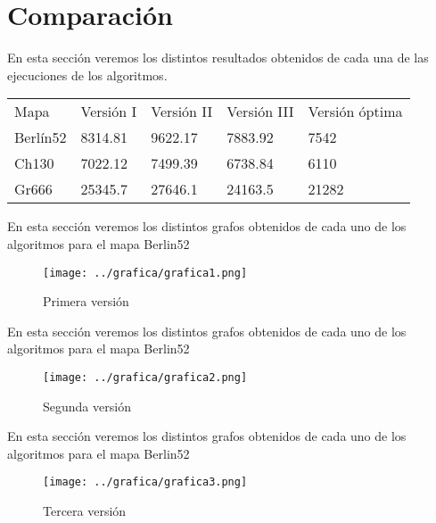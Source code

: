 	\section{Comparación}

		En esta sección veremos los distintos resultados obtenidos de cada una de las ejecuciones de los algoritmos.
		
		\begin{table}[H]
			\centering
			
			
			\begin{tabular}{l|l|l|l|l}
				Mapa	& Versión I & Versión II & Versión III  & Versión óptima  \\
				Berlín52	&  8314.81  &9622.17  & 7883.92 & 7542  \\
				Ch130	& 7022.12   & 7499.39  & 6738.84 & 6110  \\
				Gr666
				& 25345.7
				& 27646.1  & 24163.5 & 21282 \\
			\end{tabular}
			
		\end{table}
		

		En esta sección veremos los distintos grafos obtenidos de cada uno de los algoritmos para el mapa Berlin52
		
		\begin{figure}
			\centering
			\texttt{[image: ../grafica/grafica1.png]}
			\caption{Primera versión}
			\label{fig:graficafinal}
		\end{figure}
		

		En esta sección veremos los distintos grafos obtenidos de cada uno de los algoritmos para el mapa Berlin52
		
		\begin{figure}
			\centering
			\texttt{[image: ../grafica/grafica2.png]}
			\caption{Segunda versión}
			\label{fig:graficafinal}
		\end{figure}
		
		
		

		En esta sección veremos los distintos grafos obtenidos de cada uno de los algoritmos para el mapa Berlin52
		
		\begin{figure}
			\centering
			\texttt{[image: ../grafica/grafica3.png]}
			\caption{Tercera versión}
			\label{fig:graficafinal}
		\end{figure}
		
		
	
	
	
	
 